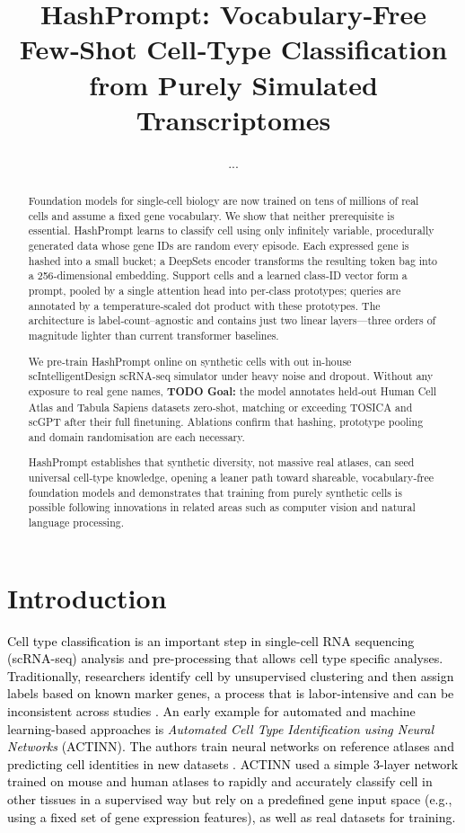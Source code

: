 \documentclass{article}
\title{HashPrompt: Vocabulary‑Free Few‑Shot Cell‑Type Classification from Purely Simulated Transcriptomes}
\author{%
	...
}
\newcommand{\gpt}[1]{\textcolor{black}{#1}}
\begin{document}
\maketitle

\begin{abstract}

Foundation models for single‑cell biology are now trained on tens of millions of real cells and assume a fixed gene vocabulary. We show that neither prerequisite is essential. HashPrompt learns to classify cell   using only infinitely variable, procedurally generated data whose gene IDs are random every episode. Each expressed gene is hashed into a small bucket; a DeepSets encoder transforms the resulting token bag into a 256‑dimensional embedding. Support cells and a learned class‑ID vector form a prompt, pooled by a single attention head into per‑class prototypes; queries are annotated by a temperature‑scaled dot product with these prototypes. The architecture is label‑count–agnostic and contains just two linear layers—three orders of magnitude lighter than current transformer baselines.

We pre‑train HashPrompt online on synthetic cells with out in-house scIntelligentDesign scRNA-seq simulator under heavy noise and dropout. Without any exposure to real gene names, \textbf{TODO Goal:} the model annotates held‑out Human Cell Atlas and Tabula Sapiens datasets zero‑shot, matching or exceeding TOSICA and scGPT after their full finetuning. Ablations confirm that hashing, prototype pooling and domain randomisation are each necessary.

HashPrompt establishes that synthetic diversity, not massive real atlases, can seed universal cell‑type knowledge, opening a leaner path toward shareable, vocabulary‑free foundation models and demonstrates that training from purely synthetic cells is possible following innovations in related areas such as computer vision and natural language processing.

\end{abstract}


\section{Introduction}

\gpt{Cell type classification is an important step in single-cell RNA sequencing (scRNA-seq) analysis and pre-processing that allows cell type specific analyses. Traditionally, researchers identify cell   by unsupervised clustering and then assign labels based on known marker genes, a process that is labor-intensive and can be inconsistent across studies \cite{ma2020actinn}. An early example for automated and machine learning-based approaches is \textit{Automated Cell Type Identification using Neural Networks} (ACTINN). The authors train neural networks on reference atlases and predicting cell identities in new datasets \cite{ma2020actinn}. ACTINN used a simple 3-layer network trained on mouse and human atlases to rapidly and accurately classify cell   in other tissues in a supervised way but rely on a predefined gene input space (e.g., using a fixed set of gene expression features), as well as real datasets for training.}
\end{document}
